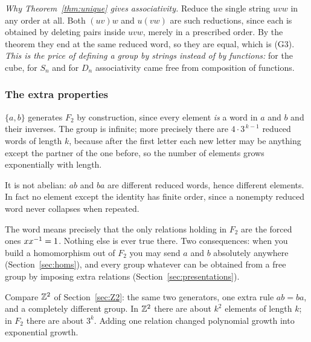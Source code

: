 
\begin{why}
\emph{Why Theorem~\ref{thm:unique} gives associativity.} Reduce the single string $uvw$ in any order
at all. Both $(uv)w$ and $u(vw)$ are such reductions, since each is obtained by deleting pairs
inside $uvw$, merely in a prescribed order. By the theorem they end at the same reduced word, so
they are equal, which is (G3). \emph{This is the price of defining a group by strings instead of by
functions:} for the cube, for $S_n$ and for $D_n$ associativity came free from composition of
functions.
\end{why}



\subsubsection*{The extra properties}

$\{a,b\}$ generates $F_2$ by construction, since every element \emph{is} a word in $a$ and $b$ and
their inverses. The group is infinite; more precisely there are $4\cdot 3^{\,k-1}$ reduced words of
length $k$, because after the first letter each new letter may be anything except the partner of the
one before, so the number of elements grows exponentially with length.

It is not abelian: $ab$ and $ba$ are different reduced words, hence different elements. In fact no
element except the identity has finite order, since a nonempty reduced word never collapses when
repeated.

The word  means precisely that the only relations holding in $F_2$ are the forced ones
$xx^{-1}=1$. Nothing else is ever true there. Two consequences: when you build a homomorphism out of
$F_2$ you may send $a$ and $b$ absolutely anywhere (Section~\ref{sec:homs}), and every group
whatever can be obtained from a free group by imposing extra relations
(Section~\ref{sec:presentations}).

\begin{pitfall}
Compare $\mathbb{Z}^2$ of Section~\ref{sec:Z2}: the same two generators, one extra rule $ab=ba$, and a
completely different group. In $\mathbb{Z}^2$ there are about $k^2$ elements of length $k$; in $F_2$ there
are about $3^k$. Adding one relation changed polynomial growth into exponential growth.
\end{pitfall}

